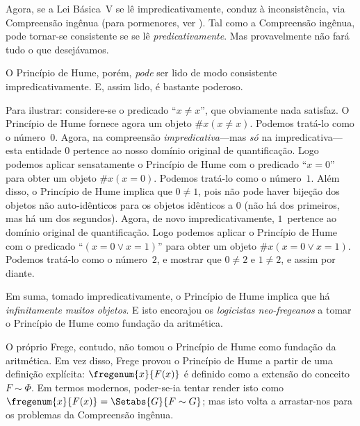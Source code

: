 \documentclass[../../../include/open-logic-section]{subfiles}
\begin{document}
Agora, se a Lei Básica~V se lê impredicativamente, conduz à
inconsistência, via Compreensão ingênua (para pormenores, ver
). Tal como a Compreensão ingênua, pode tornar-se
consistente se se lê \emph{predicativamente}. Mas provavelmente não fará
tudo o que desejávamos.

O Princípio de Hume, porém, \emph{pode} ser lido de modo consistente
impredicativamente. E, assim lido, é bastante poderoso.

Para ilustrar: considere-se o predicado ``$x \neq x$'', que obviamente
nada satisfaz. O Princípio de Hume fornece agora um objeto $\# x( x\neq
x)$. Podemos tratá-lo como o número~$0$. Agora, na compreensão
\emph{impredicativa}---mas \emph{só} na
impredicativa---esta entidade $0$ pertence ao nosso
domínio original de quantificação. Logo podemos aplicar sensatamente o Princípio de
Hume com o predicado ``$x = 0$'' para obter um objeto $\#x (x =
0)$. Podemos tratá-lo como o número~$1$. Além disso, o Princípio de Hume
implica que $0 \neq 1$, pois não pode haver bijeção dos objetos não auto-idênticos para os objetos idênticos a $0$ (não há dos primeiros, mas há um dos segundos). Agora, de novo impredicativamente, $1$~pertence ao domínio original de
quantificação. Logo podemos aplicar o Princípio de Hume com o
predicado ``$(x = 0 \lor x = 1)$'' para obter um objeto $\#x(x = 0 \lor
x = 1)$. Podemos tratá-lo como o número~$2$, e mostrar que
$0\neq 2$ e $1 \neq 2$, e assim por diante.

Em suma, tomado impredicativamente, o Princípio de Hume implica que há
\emph{infinitamente muitos objetos}. E isto encorajou os
\emph{logicistas neo-fregeanos} a tomar o Princípio de Hume como
fundação da aritmética.

O próprio Frege, contudo, não tomou o Princípio de Hume como fundação da aritmética. Em vez disso, Frege provou o Princípio de Hume a partir de
uma definição explícita: $\fregenum{x}{F(x)}$ é definido como a extensão do
conceito $F \sim \Phi$. Em termos modernos, poder-se-ia tentar render isto como $\fregenum{x}{F(x)} = \Setabs{G}{F \sim G}$; mas isto volta a arrastar-nos para os problemas da Compreensão ingênua.
\end{document}
